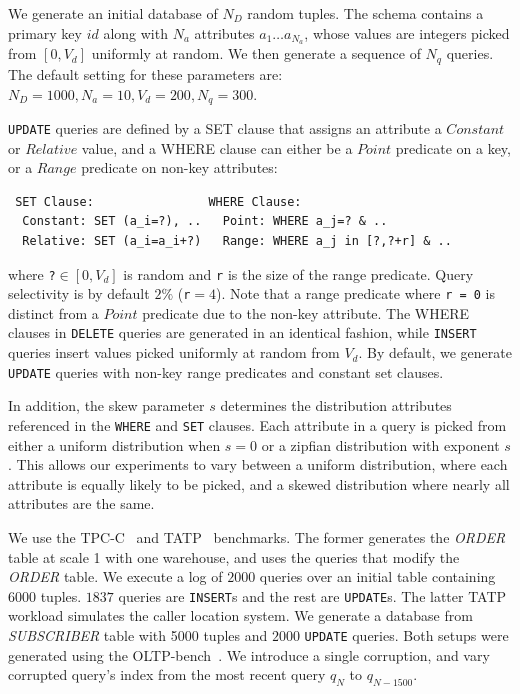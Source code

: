  \label{sec:syntheticgen}
We generate an initial database of $N_D$ random tuples.  
The schema contains a primary key $id$ along with $N_a$ attributes $a_1\ldots a_{N_a}$, whose values are integers picked from $[0, V_d]$ uniformly at random.
We then generate a sequence of $N_q$ queries. 
The default setting for these parameters are: $N_D = 1000, N_a = 10, V_d = 200, N_q = 300$. 


\texttt{UPDATE} queries are defined by a SET clause that assigns an attribute a $Constant$ or $Relative$ value,
and a WHERE clause can either be a $Point$ predicate on a key, or a $Range$ predicate on non-key attributes:

\begin{scriptsize}
\begin{verbatim}
 SET Clause:                WHERE Clause:
  Constant: SET (a_i=?), ..   Point: WHERE a_j=? & ..
  Relative: SET (a_i=a_i+?)   Range: WHERE a_j in [?,?+r] & ..\end{verbatim}
\end{scriptsize}
\noindent where \verb|?|$\in [0, V_d]$ is random and \verb|r| is the size of the range predicate. 
Query selectivity is by default $2\%$ (\verb|r|$=4$).
Note that a range predicate where \texttt{r = 0} is distinct from a $Point$ predicate due to the non-key attribute.
The WHERE clauses in \texttt{DELETE} queries are generated in an identical fashion, while
\texttt{INSERT} queries insert values picked uniformly at random from $V_d$.
By default, we generate \texttt{UPDATE} queries with non-key range predicates and constant set clauses.
  
In addition, the skew parameter $s$ determines the distribution attributes referenced in the \texttt{WHERE} and \texttt{SET} clauses.  
Each attribute in a query is picked from either a uniform distribution when $s=0$ or a zipfian distribution with exponent $s$.
This allows our experiments to vary between a uniform distribution, where each attribute is
equally likely to be picked, and a skewed distribution where nearly all attributes are the same. 


 We use the TPC-C~\cite{tpcc} and TATP~\cite{tatp} benchmarks.
The former generates the {\it ORDER} table at scale 1 with one warehouse, and uses the queries that modify the {\it ORDER} table. 
We execute a log of $2000$ queries over an initial table containing 6000 tuples.  
$1837$ queries are \texttt{INSERT}s and the rest are \texttt{UPDATE}s. 
The latter TATP workload simulates the caller location system. 
We generate a database from {\it SUBSCRIBER} table with 5000 tuples and $2000$ \texttt{UPDATE} queries.
Both setups were generated using the OLTP-bench~\cite{difallah2013oltp}. 
We introduce a single corruption, and vary corrupted query's index from the most recent query $q_N$ to $q_{N-1500}$.



